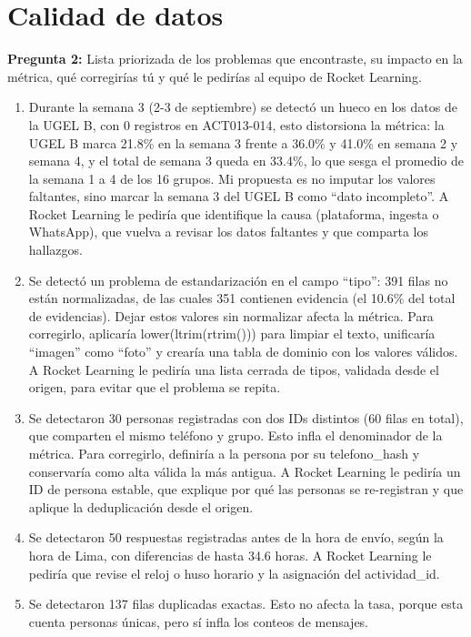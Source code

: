 \documentclass[12pt,a4paper]{article}
\begin{document}
	\newpage
	\section{Calidad de datos}
		
		\noindent \textbf{Pregunta 2:} Lista priorizada de los problemas que 
		encontraste, su impacto en la métrica, qué corregirías tú y qué le pedirías al equipo de 
		Rocket Learning. 
		
			\begin{enumerate}
				\item Durante la semana 3 (2-3 de septiembre) se detectó un hueco en los datos de la UGEL B, 
				      con 0 registros en ACT013-014, esto distorsiona la métrica: la UGEL B marca 21.8\% en la
				      semana 3 frente a 36.0\% y 41.0\% en semana 2 y semana 4, y el total de semana 3 queda en 33.4\%,
				      lo que sesga el promedio de la semana 1 a 4 de los 16 grupos. Mi propuesta es no imputar los valores
				      faltantes, sino marcar la semana 3 del UGEL B como “dato incompleto”. A Rocket Learning le pediría que identifique la causa
				      (plataforma, ingesta o WhatsApp), que vuelva a revisar los datos faltantes y que 
				      comparta los hallazgos.
				\item Se detectó un problema de estandarización en el campo “tipo”: 391 filas no están normalizadas,
				      de las cuales 351 contienen evidencia (el 10.6\% del total de evidencias). Dejar estos valores
				      sin normalizar afecta la métrica. Para corregirlo, aplicaría
				      lower(ltrim(rtrim())) para limpiar el texto, unificaría “imagen” como “foto” y crearía una tabla
				      de dominio con los valores válidos. A Rocket Learning le pediría una lista cerrada de tipos,
				      validada desde el origen, para evitar que el problema se repita.
				\item Se detectaron 30 personas registradas con dos IDs distintos (60 filas en total), que comparten 
				      el mismo teléfono y grupo. Esto infla el denominador de la métrica. Para corregirlo, definiría
				      a la persona por su telefono\_hash y conservaría como alta
				      válida la más antigua. A Rocket Learning le pediría un ID de persona estable, que explique por
				      qué las personas se re-registran y que aplique la deduplicación desde el origen.
				\item Se detectaron 50 respuestas registradas antes de la hora 
				      de envío, según la hora de Lima, con diferencias de hasta 34.6 horas.
				      A Rocket Learning le pediría que revise el reloj o huso horario y la asignación del actividad\_id.
				\item Se detectaron 137 filas duplicadas exactas. Esto no afecta la tasa, porque esta
				      cuenta personas únicas, pero sí infla los conteos de mensajes.
			\end{enumerate}
			
\end{document}
